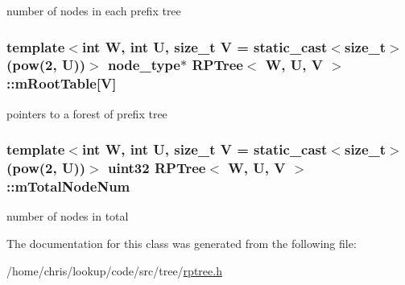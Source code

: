 number of nodes in each prefix tree 

\hypertarget{classRPTree_a5dc7d0ead186301ede56ae8dfeec3f4a}{
\subsubsection[{m\-Root\-Table}]{\setlength{\rightskip}{0pt plus 5cm}template$<$int W, int U, size\-\_\-t V = static\-\_\-cast$<$size\-\_\-t$>$(pow(2, U))$>$ {\bf node\-\_\-type}$\ast$ {\bf R\-P\-Tree}$<$ {\bf W}, U, V $>$\-::m\-Root\-Table\mbox{[}V\mbox{]}\hspace{0.3cm}{\ttfamily [private]}}}\label{classRPTree_a5dc7d0ead186301ede56ae8dfeec3f4a}


pointers to a forest of prefix tree 

\hypertarget{classRPTree_a66f36da0f534bec580cd85098640688e}{
\subsubsection[{m\-Total\-Node\-Num}]{\setlength{\rightskip}{0pt plus 5cm}template$<$int W, int U, size\-\_\-t V = static\-\_\-cast$<$size\-\_\-t$>$(pow(2, U))$>$ {\bf uint32} {\bf R\-P\-Tree}$<$ {\bf W}, U, V $>$\-::m\-Total\-Node\-Num\hspace{0.3cm}{\ttfamily [private]}}}\label{classRPTree_a66f36da0f534bec580cd85098640688e}


number of nodes in total 



The documentation for this class was generated from the following file\-:\begin{DoxyCompactItemize}
\item 
/home/chris/lookup/code/src/tree/\hyperlink{rptree_8h}{rptree.\-h}\end{DoxyCompactItemize}
